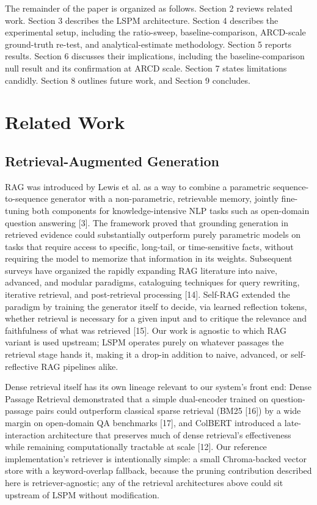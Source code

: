 \documentclass[pdflatex,sn-basic,Numbered]{sn-jnl}
\begin{document}
The remainder of the paper is organized as follows. Section 2 reviews related work. Section 3 describes the LSPM architecture. Section 4 describes the experimental setup, including the ratio-sweep, baseline-comparison, ARCD-scale ground-truth re-test, and analytical-estimate methodology. Section 5 reports results. Section 6 discusses their implications, including the baseline-comparison null result and its confirmation at ARCD scale. Section 7 states limitations candidly. Section 8 outlines future work, and Section 9 concludes.

\section{Related Work}
\subsection{Retrieval-Augmented Generation}
RAG was introduced by Lewis et al. as a way to combine a parametric sequence-to-sequence generator with a non-parametric, retrievable memory, jointly fine-tuning both components for knowledge-intensive NLP tasks such as open-domain question answering [3]. The framework proved that grounding generation in retrieved evidence could substantially outperform purely parametric models on tasks that require access to specific, long-tail, or time-sensitive facts, without requiring the model to memorize that information in its weights. Subsequent surveys have organized the rapidly expanding RAG literature into naive, advanced, and modular paradigms, cataloguing techniques for query rewriting, iterative retrieval, and post-retrieval processing [14]. Self-RAG extended the paradigm by training the generator itself to decide, via learned reflection tokens, whether retrieval is necessary for a given input and to critique the relevance and faithfulness of what was retrieved [15]. Our work is agnostic to which RAG variant is used upstream; LSPM operates purely on whatever passages the retrieval stage hands it, making it a drop-in addition to naive, advanced, or self-reflective RAG pipelines alike.

Dense retrieval itself has its own lineage relevant to our system's front end: Dense Passage Retrieval demonstrated that a simple dual-encoder trained on question-passage pairs could outperform classical sparse retrieval (BM25 [16]) by a wide margin on open-domain QA benchmarks [17], and ColBERT introduced a late-interaction architecture that preserves much of dense retrieval's effectiveness while remaining computationally tractable at scale [12]. Our reference implementation's retriever is intentionally simple: a small Chroma-backed vector store with a keyword-overlap fallback, because the pruning contribution described here is retriever-agnostic; any of the retrieval architectures above could sit upstream of LSPM without modification.
\end{document}
